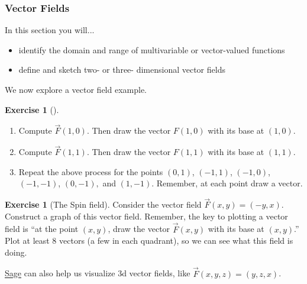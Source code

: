 \documentclass[10pt,]{book}
\theoremstyle{plain}
\theoremstyle{definition}
\theoremstyle{definition}
\theoremstyle{definition}
\theoremstyle{definition}
\newtheorem{exploration}[project]{Exercise}
\theoremstyle{definition}
\numberwithin{equation}{section}
\begin{document}
\subsubsection[{Vector Fields}]{Vector Fields}\label{subsubsection-2}
In this section you will... \leavevmode%
\begin{itemize}[label=\textbullet]
\item{}identify the domain and range of multivariable or vector-valued functions%
\item{}define and sketch two- or three- dimensional vector fields%
\end{itemize}
%
\par
We now explore a vector field example.%
\begin{exploration}[]\label{exploration-118}
\leavevmode%
\begin{enumerate}[font=\bfseries,label=(\alph*),ref=\alph*]
\item\label{task-240} Compute \(\vec F(1,0)\). Then draw the vector \(F(1,0)\) with its base at \((1,0)\).%
\item\label{task-241} Compute \(\vec F(1,1)\). Then draw the vector \(F(1,1)\) with its base at \((1,1)\).%
\item\label{task-242} Repeat the above process for the points \((0,1)\), \((-1,1)\), \((-1,0)\), \((-1,-1)\), \((0,-1),\) and \((1,-1)\). Remember, at each point draw a vector.%
\end{enumerate}
\end{exploration}
\begin{exploration}[The Spin field]\label{exploration-119}
Consider the vector field \(\vec F(x,y)=(-y,x)\). Construct a graph of this vector field. Remember, the key to plotting a vector field is ``at the point \((x,y)\), draw the vector \(\vec F(x,y)\) with its base at \((x,y)\).'' Plot at least 8 vectors (a few in each quadrant), so we can see what this field is doing.%
\end{exploration}
\href{http://aleph.sagemath.org/?z=eJxz06jQqdSp0lSwVdAA0joVmlwFOfkl8WWpySX5RfFpmak5KcYpGm46CkCFusY6xpo6IIUQlkYVhKEJAOGFExs}{Sage} can also help us visualize 3d vector fields, like \(\vec F(x,y,z)=(y,z,x)\).%
\typeout{************************************************}
\typeout{************************************************}
\end{document}
